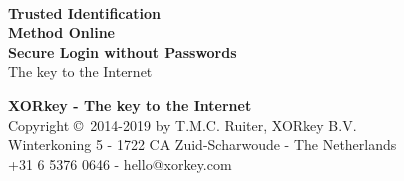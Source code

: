 


\raggedbottom
\begin{titlepage}
\begin{center}
\hspace*{2.5cm}
\newline
\dashes
\vspace*{1.0cm}
\sffamily
\Huge
\textbf{\textcolor{darkxor}{\TIMO}}\\
\textbf{\textcolor{darkxor}{Trusted Identification}}\\
\textbf{\textcolor{darkxor}{Method Online}}\\
\vspace{5mm}
\Large
\textbf{\textcolor{darkxor}{Secure Login without Passwords}}\\
\vspace{20mm}
\hspace*{2.7cm}
\newline
\normalsize
\textcolor{darkxor}{The key to the Internet}
\end{center}
\end{titlepage}
\newpage
\thispagestyle{empty}
\vspace*{6.00cm}
\dashes
\begin{center}
\vspace*{-.5em}
\textbf{XORkey - The key to the Internet}\\
\vspace{1em}
\small
Copyright \copyright\ 2014-2019 by T.M.C. Ruiter, XORkey B.V.\\
Winterkoning 5 - 1722 CA Zuid-Scharwoude - The Netherlands\\
+31 6 5376 0646 - hello@xorkey.com 
\normalsize
\end{center}
\newpage
